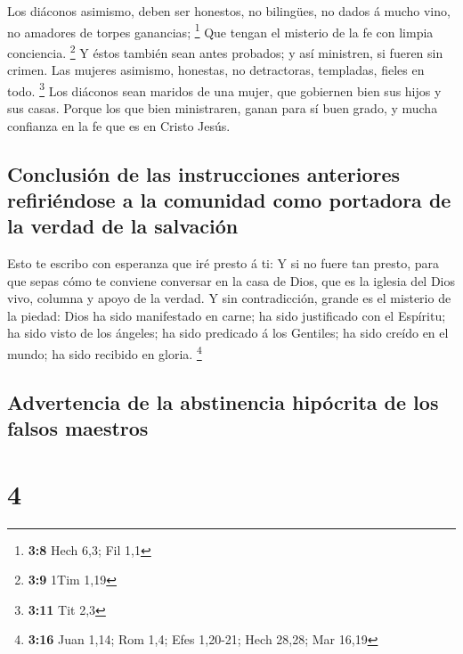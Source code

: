 Los diáconos asimismo, deben ser honestos, no bilingües, no
dados á mucho vino, no amadores de torpes ganancias; \footnote{\textbf{3:8}
  Hech 6,3; Fil 1,1}  Que tengan el misterio de la fe con
limpia conciencia. \footnote{\textbf{3:9} 1Tim 1,19}  Y
éstos también sean antes probados; y así ministren, si fueren sin
crimen.  Las mujeres asimismo, honestas, no detractoras,
templadas, fieles en todo. \footnote{\textbf{3:11} Tit 2,3}
 Los diáconos sean maridos de una mujer, que gobiernen bien
sus hijos y sus casas.  Porque los que bien ministraren,
ganan para sí buen grado, y mucha confianza en la fe que es en Cristo
Jesús.

\hypertarget{conclusiuxf3n-de-las-instrucciones-anteriores-refiriuxe9ndose-a-la-comunidad-como-portadora-de-la-verdad-de-la-salvaciuxf3n}{%
\subsection{Conclusión de las instrucciones anteriores refiriéndose a la
comunidad como portadora de la verdad de la
salvación}\label{conclusiuxf3n-de-las-instrucciones-anteriores-refiriuxe9ndose-a-la-comunidad-como-portadora-de-la-verdad-de-la-salvaciuxf3n}}

 Esto te escribo con esperanza que iré presto á ti:
 Y si no fuere tan presto, para que sepas cómo te conviene
conversar en la casa de Dios, que es la iglesia del Dios vivo, columna y
apoyo de la verdad.  Y sin contradicción, grande es el
misterio de la piedad: Dios ha sido manifestado en carne; ha sido
justificado con el Espíritu; ha sido visto de los ángeles; ha sido
predicado á los Gentiles; ha sido creído en el mundo; ha sido recibido
en gloria. \footnote{\textbf{3:16} Juan 1,14; Rom 1,4; Efes 1,20-21;
  Hech 28,28; Mar 16,19}

\hypertarget{advertencia-de-la-abstinencia-hipuxf3crita-de-los-falsos-maestros}{%
\subsection{Advertencia de la abstinencia hipócrita de los falsos
maestros}\label{advertencia-de-la-abstinencia-hipuxf3crita-de-los-falsos-maestros}}

\hypertarget{section-3}{%
\section{4}\label{section-3}}

